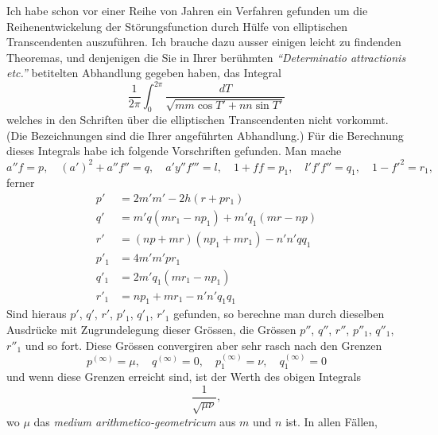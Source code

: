 \documentclass[12pt,a4paper]{article}
\begin{document}
Ich habe schon vor einer Reihe von Jahren ein Verfahren gefunden um die Reihenentwickelung der Störungsfunction durch Hülfe von elliptischen Transcendenten auszuführen. Ich brauche dazu ausser einigen leicht zu findenden Theoremas, und denjenigen die Sie in Ihrer berühmten \textit{``Determinatio attractionis etc.''} betitelten Abhandlung gegeben haben, das Integral
\[
\frac{1}{2\pi} \int_0^{2\pi} \frac{dT}{\sqrt{mm \cos T' + nn \sin T'}}
\]
welches in den Schriften über die elliptischen Transcendenten nicht vorkommt. (Die Bezeichnungen sind die Ihrer angeführten Abhandlung.) Für die Berechnung dieses Integrals habe ich folgende Vorschriften gefunden. Man mache
\[a''f = p, \quad (a')^2 + a''f'' = q, \quad a'y''f''' = l, \quad 1 + ff = p_1, \quad l'f'f'' = q_1, \quad 1 - f'^2 = r_1,\]
ferner
\begin{align*}
p' &= 2m'm' - 2h(r + pr_1)\\
q' &= m'q(mr_1 - np_1) + m'q_1(mr - np)\\
r' &= (np + mr)(np_1 + mr_1) - n'n'qq_1\\
p'_1 &= 4m'm'pr_1\\
q'_1 &= 2m'q_1(mr_1 - np_1)\\
r'_1 &= np_1 + mr_1 - n'n'q_1q_1
\end{align*}
Sind hieraus $p'$, $q'$, $r'$, $p'_1$, $q'_1$, $r'_1$ gefunden, so berechne man durch dieselben Ausdrücke mit Zugrundelegung dieser Grössen, die Grössen $p''$, $q''$, $r''$, $p''_1$, $q''_1$, $r''_1$ und so fort. Diese Grössen convergiren aber sehr rasch nach den Grenzen
\[p^{(\infty)} = \mu, \quad q^{(\infty)} = 0, \quad p^{(\infty)}_1 = \nu, \quad q^{(\infty)}_1 = 0\]
und wenn diese Grenzen erreicht sind, ist der Werth des obigen Integrals
\[\frac{1}{\sqrt{\mu \nu}},\]
wo $\mu$ das \textit{medium arithmetico-geometricum} aus $m$ und $n$ ist. In allen Fällen,
\end{document}

